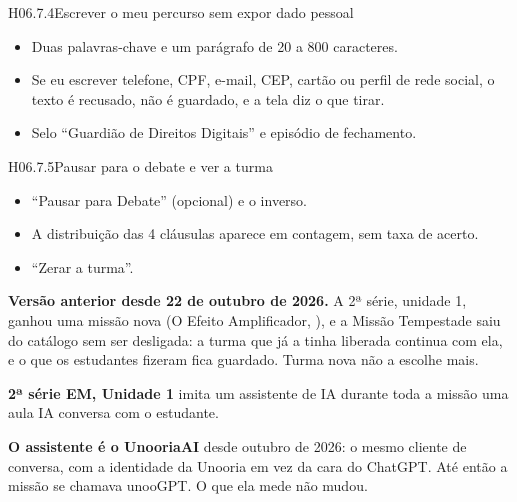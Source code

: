 \begin{historia}{H06.7.4}{Escrever o meu percurso sem expor dado pessoal}{\parcial}
\aceite
\begin{itemize}
  \item Duas palavras-chave e um parágrafo de 20 a 800 caracteres.
  \item Se eu escrever telefone, CPF, e-mail, CEP, cartão ou perfil de rede
    social, o texto é recusado, não é guardado, e a tela diz o que tirar.
  \item Selo \enquote{Guardião de Direitos Digitais} e episódio de fechamento.
\end{itemize}
\end{historia}

\begin{historia}{H06.7.5}{Pausar para o debate e ver a turma}{\pronto}
\aceite
\begin{itemize}
  \item \enquote{Pausar para Debate} (opcional) e o inverso.
  \item A distribuição das 4 cláusulas aparece em contagem, sem taxa de
    acerto.
  \item \enquote{Zerar a turma}.
\end{itemize}
\end{historia}


\textbf{Versão anterior desde 22 de outubro de 2026.} A 2ª série, unidade 1,
ganhou uma missão nova (O Efeito Amplificador, ), e a Missão
Tempestade saiu do catálogo sem ser desligada: a turma que já a tinha liberada
continua com ela, e o que os estudantes fizeram fica guardado. Turma nova não a
escolhe mais.

\textbf{2ª série EM, Unidade 1} \textperiodcentered{} imita um assistente de
IA durante toda a missão \textperiodcentered{} uma aula \textperiodcentered{}
IA conversa com o estudante.

\textbf{O assistente é o UnooriaAI} desde outubro de 2026: o mesmo cliente de
conversa, com a identidade da Unooria em vez da cara do ChatGPT. Até então a
missão se chamava unooGPT. O que ela mede não mudou.

